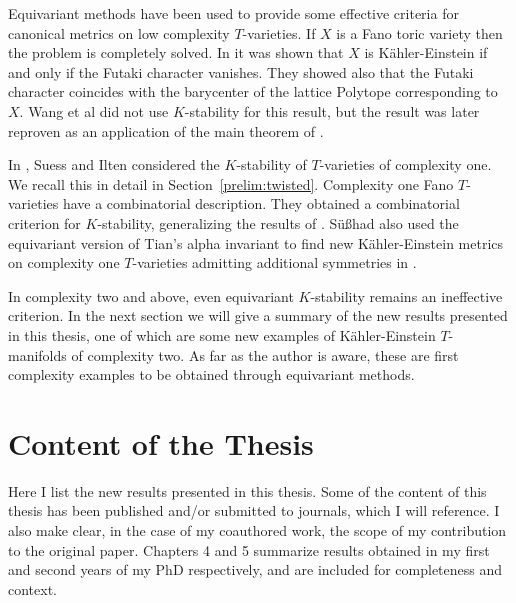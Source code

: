 Equivariant methods have been used to provide some effective criteria for canonical metrics on low complexity \(T\)-varieties. If \(X\) is a Fano toric variety then the problem is completely solved. In \cite{wang2004} it was shown that \(X\) is K\"ahler-Einstein if and only if the Futaki character vanishes. They showed also that the Futaki character coincides with the barycenter of the lattice Polytope corresponding to \(X\). Wang et al did not use \(K\)-stability for this result, but the result was later reproven as an application of the main theorem of \cite{datar2016kahler}.

In \cite{ilten2015}, Suess and Ilten considered the \(K\)-stability of \(T\)-varieties of complexity one. We recall this in detail in Section~\ref{prelim:twisted}. Complexity one Fano \(T\)-varieties have a combinatorial description. They obtained a combinatorial criterion for \(K\)-stability, generalizing the results of \cite{wang2004}. S\"u\ss had also used the equivariant version of Tian's alpha invariant to find new K\"ahler-Einstein metrics on complexity one \(T\)-varieties admitting additional symmetries in \cite{suss2013kahler}.

In complexity two and above, even equivariant \(K\)-stability remains an ineffective criterion. In the next section we will give a summary of the new results presented in this thesis, one of which are some new examples of K\"ahler-Einstein \(T\)-manifolds of complexity two. As far as the author is aware, these are first complexity examples to be obtained through equivariant methods.

\section{Content of the Thesis} \label{content}
Here I list the new results presented in this thesis. Some of the content of this thesis has been published and/or submitted to journals, which I will reference. I also make clear, in the case of my coauthored work, the scope of my contribution to the original paper. Chapters 4 and 5 summarize results obtained in my first and second years of my PhD respectively, and are included for completeness and context.

